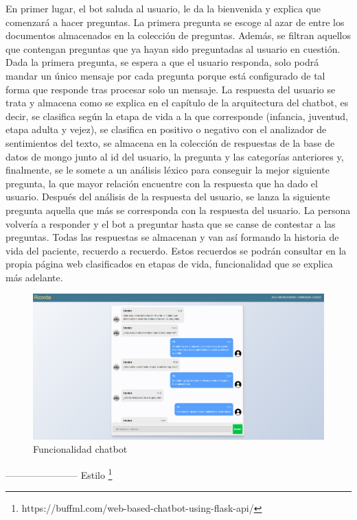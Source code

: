 En primer lugar, el bot saluda al usuario, le da la bienvenida y explica que comenzará a hacer preguntas. La primera pregunta se escoge al azar de entre los documentos almacenados en la colección de preguntas. Además, se filtran aquellos que contengan preguntas que ya hayan sido preguntadas al usuario en cuestión. Dada la primera pregunta, se espera a que el usuario responda, solo podrá mandar un único mensaje por cada pregunta porque está configurado de tal forma que responde tras procesar solo un mensaje. La respuesta del usuario se trata y almacena como se explica en el capítulo de la arquitectura del chatbot, es decir, se clasifica según la etapa de vida a la que corresponde (infancia, juventud, etapa adulta y vejez), se clasifica en positivo o negativo con el analizador de sentimientos del texto, se almacena en la colección de respuestas de la base de datos de mongo junto al id del usuario, la pregunta y las categorías anteriores y, finalmente, se le somete a un análisis léxico para conseguir la mejor siguiente pregunta, la que mayor relación encuentre con la respuesta que ha dado el usuario. Después del análisis de la respuesta del usuario, se lanza la siguiente pregunta aquella que más se corresponda con la respuesta del usuario. La persona volvería a responder y el bot a preguntar hasta que se canse de contestar a las preguntas. Todas las respuestas se almacenan y van así formando la historia de vida del paciente, recuerdo a recuerdo. Estos recuerdos se podrán consultar en la propia página web clasificados en etapas de vida, funcionalidad que se explica más adelante.

\begin{figure}[h]
	\centering
	\includegraphics[scale=0.4]{Imagenes/Vectorial/funcionalidad_chatbot}
	\caption{Funcionalidad chatbot}
	\label{fig:funcionalidadchatbot}
\end{figure}

----------------------- Estilo \footnote{https://buffml.com/web-based-chatbot-using-flask-api/}



